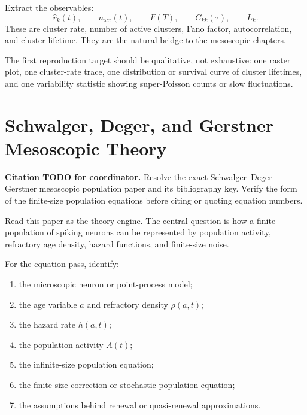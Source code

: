 Extract the observables:
%
\begin{equation}
  \widehat r_k(t),
  \qquad
  n_{\mathrm{act}}(t),
  \qquad
  F(T),
  \qquad
  C_{kk}(\tau),
  \qquad
  L_k .
  \label{eq:lk-reading-observables}
\end{equation}
%
These are cluster rate, number of active clusters, Fano factor, autocorrelation, and cluster lifetime. They are the natural bridge to the mesoscopic chapters.

The first reproduction target should be qualitative, not exhaustive: one raster plot, one cluster-rate trace, one distribution or survival curve of cluster lifetimes, and one variability statistic showing super-Poisson counts or slow fluctuations.

\section{Schwalger, Deger, and Gerstner Mesoscopic Theory}
\label{app:reading-schwalger-deger-gerstner}

\textbf{Citation TODO for coordinator.} Resolve the exact Schwalger--Deger--Gerstner mesoscopic population paper and its bibliography key. Verify the form of the finite-size population equations before citing or quoting equation numbers.

Read this paper as the theory engine. The central question is how a finite population of spiking neurons can be represented by population activity, refractory age density, hazard functions, and finite-size noise.

For the equation pass, identify:
%
\begin{enumerate}[leftmargin=*]
  \item the microscopic neuron or point-process model;
  \item the age variable $a$ and refractory density $\rho(a,t)$;
  \item the hazard rate $h(a,t)$;
  \item the population activity $A(t)$;
  \item the infinite-size population equation;
  \item the finite-size correction or stochastic population equation;
  \item the assumptions behind renewal or quasi-renewal approximations.
\end{enumerate}

